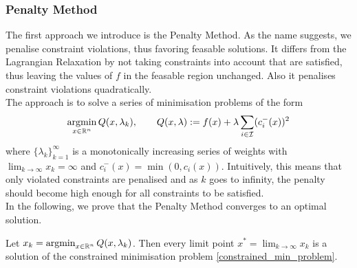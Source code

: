 \subsubsection{Penalty Method}
The first approach we introduce is the Penalty Method. As the name suggests, we penalise constraint violations, thus favoring feasable solutions. It differs from the Lagrangian Relaxation by not taking constraints into account that are satisfied, thus leaving the values of $f$ in the feasable region unchanged. Also it penalises constraint violations quadratically.\\
\indent The approach is to solve a series of minimisation problems of the form
\[\operatorname*{argmin}_{x \in \mathbb{R}^n} Q(x, \lambda_k), \qquad Q(x, \lambda) := f(x) + \lambda \sum_{i \in \mathcal{I}} (c_i^{-}(x))^2\]
where $\{\lambda_k\}_{k=1}^\infty$ is a monotonically increasing series of weights with $\lim_{k \to \infty} x_k = \infty$ and $c_i^-(x) = \min(0, c_i(x))$. Intuitively, this means that only violated constraints are penalised and as $k$ goes to infinity, the penalty should become high enough for all constraints to be satisfied.\\
In the following, we prove that the Penalty Method converges to an optimal solution.
\begin{theorem}
	Let $x_k = \operatorname*{argmin}_{x \in \mathbb{R}^n} Q(x, \lambda_k)$. Then every limit point $x^* = \lim_{k \to \infty} x_k$ is a solution of the constrained minimisation problem \ref{constrained_min_problem}.
\end{theorem}
